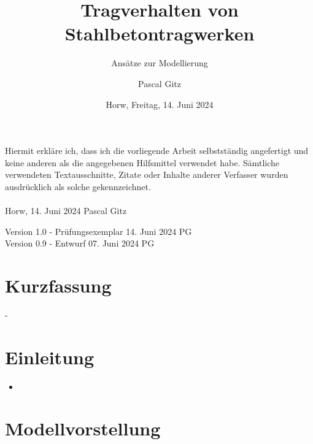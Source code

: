 \documentclass[
  11pt,
  letterpaper,
]{scrreprt}
\title{Tragverhalten von Stahlbetontragwerken}
\subtitle
{Ansätze zur Modellierung}
\date{\large Horw, Freitag, 14. Juni 2024}
\author{Pascal Gitz}
\providecommand{\tightlist}{%
  \setlength{\itemsep}{0pt}\setlength{\parskip}{0pt}}\usepackage{longtable,booktabs,array}
\renewcommand*\contentsname{Inhaltsverzeichnis}
\newcommand\contentsname{Inhaltsverzeichnis}
\begin{document}
\maketitle


Hiermit erkläre ich, dass ich die vorliegende Arbeit selbstständig angefertigt und keine anderen als die angegebenen Hilfsmittel verwendet habe. Sämtliche verwendeten Textausschnitte, Zitate oder Inhalte anderer Verfasser wurden ausdrücklich als solche gekennzeichnet.\\%
%
\\%
%
Horw, 14. Juni 2024 \hfill Pascal Gitz%

\vfill

Version 1.0 - Prüfungsexemplar \hfill 14. Juni 2024 \quad \quad \quad \quad \quad PG\\
Version 0.9 - Entwurf \hfill 07. Juni 2024 \quad \quad \quad \quad \quad PG\\

\newpage

\chapter*{Kurzfassung}

-

\renewcommand*\contentsname{Inhaltsverzeichnis}
{
\hypersetup{linkcolor=}
\setcounter{tocdepth}{1}
\tableofcontents
}
\listoffigures
\listoftables
{}

\chapter{Einleitung}\label{einleitung}

\begin{itemize}
\tightlist
\item
\end{itemize}


\chapter{Modellvorstellung}\label{sec-modellvorstellung}
\end{document}
